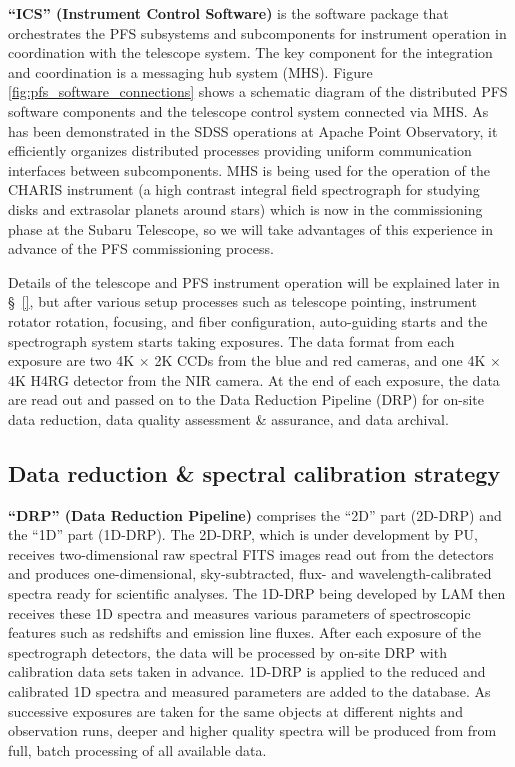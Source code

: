 \documentclass[a4paper]{article}
\begin{document}
{\bf ``ICS'' (Instrument Control Software)} is the software package
that orchestrates the PFS subsystems and subcomponents for instrument
operation in coordination with the telescope system. The key component
for the integration and coordination is a messaging hub system
(MHS). Figure \ref{fig:pfs_software_connections} shows a schematic
diagram of the distributed PFS software components and the telescope
control system connected via MHS. As has been demonstrated in the SDSS
operations at Apache Point Observatory, it efficiently organizes
distributed processes providing uniform communication interfaces
between subcomponents. MHS is being used for the operation of the
CHARIS instrument\cite{charis} (a high contrast integral field
spectrograph for studying disks and extrasolar planets around stars)
which is now in the commissioning phase at the Subaru Telescope, so we
will take advantages of this experience in advance of the PFS
commissioning process.

Details of the telescope and PFS instrument operation will be
explained later in \S~\ref{}, but after various setup processes such
as telescope pointing, instrument rotator rotation, focusing, and
fiber configuration, auto-guiding starts and the spectrograph system
starts taking exposures. The data format from each exposure are two 4K
$\times$ 2K CCDs from the blue and red cameras, and one 4K $\times$ 4K
H4RG detector from the NIR camera. At the end of each exposure, the
data are read out and passed on to the Data Reduction Pipeline (DRP)
for on-site data reduction, data quality assessment \& assurance, and
data archival.

\subsection{Data reduction \& spectral calibration strategy}
\label{subsec:reduction-calibration}

{\bf ``DRP'' (Data Reduction Pipeline)} comprises the ``2D'' part
(2D-DRP) and the ``1D'' part (1D-DRP). The 2D-DRP, which is under
development by PU, receives two-dimensional raw spectral FITS images
read out from the detectors and produces one-dimensional,
sky-subtracted, flux- and wavelength-calibrated spectra ready for
scientific analyses. The 1D-DRP being developed by LAM then receives
these 1D spectra and measures various parameters of spectroscopic
features such as redshifts and emission line fluxes. After each
exposure of the spectrograph detectors, the data will be processed by
on-site DRP with calibration data sets taken in advance.
1D-DRP is applied to the reduced and calibrated 1D spectra and
measured parameters are added to the database. As successive exposures
are taken for the same objects at different nights and observation
runs, deeper and higher quality spectra will be produced from from
full, batch processing of all available data.
\end{document}
